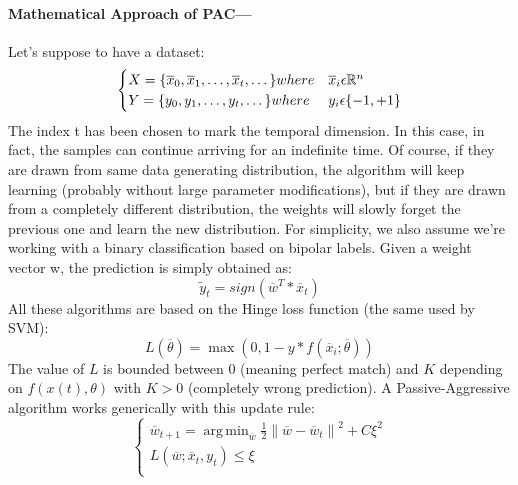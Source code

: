 \documentclass[11.5pt]{article}
\newcommand\norm[1]{\left\lVert#1\right\rVert}
\DeclareMathOperator*{\argmin}{arg\,min}
\begin{document}
\begin{multicols}{2}
\paragraph{Mathematical Approach of PAC--- \citep{giuseppebonaccorso} \citep{crammer} \\}
Let’s suppose to have a dataset:
\begin{equation}
    \begin{cases} 
      X = \set{\overline{x}_0, \overline{x}_1, \dots, \overline{x}_t, \dots} where & \overline{x}_i \epsilon \mathbb{R}^n \\
      Y = \set{y_0, y_1, \dots, y_t, \dots} where & y_i \epsilon \set{-1, +1} \\
   \end{cases}
\end{equation}
The index t has been chosen to mark the temporal dimension. In this case, in fact, the samples can continue arriving for an indefinite time. Of course, if they are drawn from same data generating distribution, the algorithm will keep learning (probably without large parameter modifications), but if they are drawn from a completely different distribution, the weights will slowly forget the previous one and learn the new distribution. For simplicity, we also assume we’re working with a binary classification based on bipolar labels.
\newline
Given a weight vector w, the prediction is simply obtained as:
\begin{equation}
    \widetilde{y}_t = sign(\overline{w}^T * \overline{x}_t)
\end{equation}
All these algorithms are based on the Hinge loss function (the same used by SVM):
\begin{equation}
    L(\overline{\theta}) = \max(0, 1 - y * f(\overline{x}_i;\overline{\theta}))
\end{equation}
The value of $L$ is bounded between $0$ (meaning perfect match) and $K$ depending on $f(x(t),\theta)$ with $K>0$ (completely wrong prediction). A Passive-Aggressive algorithm works generically with this update rule:
\begin{equation}
    \begin{cases} 
      \overline{w}_{t+1} = \argmin_{\overline{w}} \frac{1}{2} \norm{\overline{w} - \overline{w}_t}^2 + C \xi^2\\
      L(\overline{w}; \overline{x}_t, y_t) \leq \xi \\
   \end{cases}
\end{equation}

\end{multicols}
\end{document}
